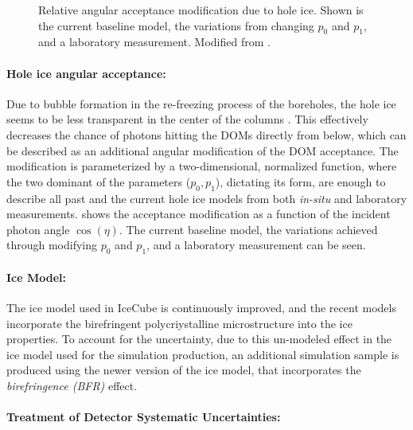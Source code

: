 \begin{figure}[h]
    \centering
    
    \caption[Hole ice angular acceptance modification]{Relative angular acceptance modification due to hole ice. Shown is the current baseline model, the variations from changing $p_0$ and $p_1$, and a laboratory measurement. Modified from \cite{ATrettin_phd}.}
\end{figure}
\paragraph{Hole ice angular acceptance:}

Due to bubble formation in the re-freezing process of the boreholes, the hole ice seems to be less transparent in the center of the columns . This effectively decreases the chance of photons hitting the DOMs directly from below, which can be described as an additional angular modification of the DOM acceptance. The modification is parameterized by a two-dimensional, normalized function, where the two dominant of the parameters ($p_0, p_1$), dictating its form, are enough to describe all past and the current hole ice models from both \textit{in-situ} and laboratory measurements.  shows the acceptance modification as a function of the incident photon angle $\cos(\eta)$. The current baseline model, the variations achieved through modifying $p_0$ and $p_1$, and a laboratory measurement can be seen.


\paragraph{Ice Model:}

The ice model used in IceCube is continuously improved, and the recent models incorporate the birefringent polycriystalline microstructure  into the ice properties. To account for the uncertainty, due to this un-modeled effect in the ice model used for the simulation production, an additional simulation sample is produced using the newer version of the ice model, that incorporates the \textit{birefringence (BFR)} effect. 


\paragraph{Treatment of Detector Systematic Uncertainties:} 

